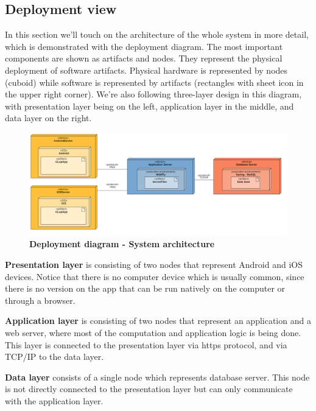 \subsection{Deployment view}
\hspace{\parindent} In this section we'll touch on the architecture of the whole system in more detail, which is demonstrated with the deployment diagram. The most important components are shown as artifacts and nodes. They represent the physical deployment of software artifacts. Physical hardware is represented by nodes (cuboid) while software is represented by artifacts (rectangles with sheet icon in the upper right corner). We're also following three-layer design in this diagram, with presentation layer being on the left, application layer in the middle, and data layer on the right.   

\begin{figure}[!h]
\centering
\includegraphics[width=\textwidth]{Images/DeploymentDiagram1v2}
\caption{\label{fig:deploymentdiagram}\textbf{Deployment diagram -  System architecture}}
\end{figure}


\textbf{Presentation layer} is consisting of two nodes that represent Android and iOS devices. Notice that there is no computer device which is usually common, since there is no version on the app that can be run natively on the computer or through a browser.   

  

\textbf{Application layer }is consisting of two nodes that represent an application and a web server, where most of the computation and application logic is being done. This layer is connected to the presentation layer via https protocol, and via TCP/IP to the data layer.  

  

\textbf{Data layer} consists of a single node which represents database server. This node is not directly connected to the presentation layer but can only communicate with the application layer.  

